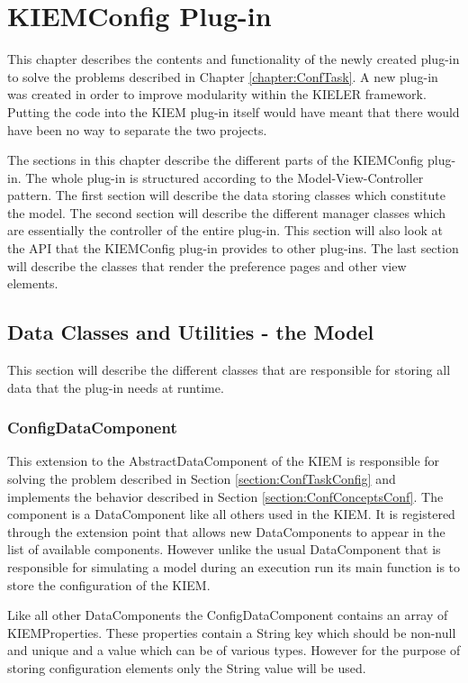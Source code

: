 \chapter{\ac{KIEMConfig} Plug-in}
\label{chapter:KiemConfig}
This chapter describes the contents and functionality of the newly created
plug-in to solve the problems described in Chapter \ref{chapter:ConfTask}.
A new plug-in was created in order to improve modularity within the \ac{KIELER} framework.
Putting the code into the \ac{KIEM} plug-in itself would have meant that
there would have been no way to separate the two projects.

The sections in this chapter describe the different parts of the \ac{KIEMConfig} plug-in.
The whole plug-in is structured according to the Model-View-Controller pattern.
The first section will describe the data storing classes which constitute the model.
The second section will describe the different manager classes which are essentially the
controller of the entire plug-in. This section will also look at the \ac{API} that the
\ac{KIEMConfig} plug-in provides to other plug-ins.
The last section will describe the classes that render the preference pages and other
view elements.

\section{Data Classes and Utilities - the Model}
\label{section:ConfModel}
This section will describe the different classes that are responsible for storing all
data that the plug-in needs at runtime.


\subsection{ConfigDataComponent}
\label{section:ConfigDataComponent}
This extension to the AbstractDataComponent of the \ac{KIEM} is responsible for solving
the problem described in Section \ref{section:ConfTaskConfig} and implements the behavior
described in Section \ref{section:ConfConceptsConf}. The component is a DataComponent
like all others used in the \ac{KIEM}. It is registered through the extension point
that allows new DataComponents to appear in the list of available components.
However unlike the usual DataComponent that is responsible for simulating a model during
an execution run its main function is to store the configuration of the \ac{KIEM}.

Like all other DataComponents the ConfigDataComponent contains an array of
KIEMProperties. These properties contain a String key which should be non-null and unique and 
a value which can be of various types. However for the purpose of storing configuration
elements only the String value will be used.

